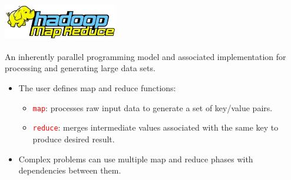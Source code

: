 \documentclass[hyperref={pdfpagelabels=false}]{beamer}
\begin{document}
\begin{frame}
\frametitle{\includegraphics[height=0.60in,
keepaspectratio=true]{./images/mapreduce-logo.jpg}}

An inherently parallel programming model and associated implementation for
processing and generating large data sets.\\
\pause
\begin{itemize}
 \item The user defines map and reduce functions:
  \pause
  \begin{itemize}
  \item \textcolor{red}{\tt map}: processes raw input data to generate a set of
				key/value pairs.
  \pause
  \item \textcolor{red}{\tt reduce}: merges intermediate values associated with
				   the same key to produce desired result.
  \end{itemize}
\pause
\item Complex problems can use multiple map and reduce phases with
dependencies between them. 

\end{itemize}
\end{frame}


% 
% 
% 
% 
\end{document}
